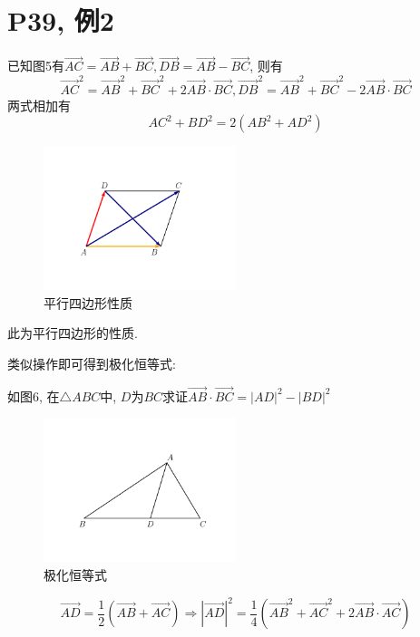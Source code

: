 \documentclass{book}
\begin{document}
    \section{\textcolor[rgb]{0.11,0.65,0.52}{P39, 例2}}
    已知图5有$\overrightarrow{AC}=\overrightarrow{AB}+\overrightarrow{BC},\overrightarrow{DB}=\overrightarrow{AB}-\overrightarrow{BC}$, 则有$$\overrightarrow{AC}^2=\overrightarrow{AB}^2+\overrightarrow{BC}^2+2\overrightarrow{AB}\cdot \overrightarrow{BC},\overrightarrow{DB}^2=\overrightarrow{AB}^2+\overrightarrow{BC}^2-2\overrightarrow{AB}\cdot \overrightarrow{BC}$$
    \textcolor[rgb]{0.75,0.17,0.22}{两式相加}有$$AC^2+BD^2=2(AB^2+AD^2)$$
    \begin{figure}[htbp]
        \centering
        \includegraphics[width=0.5\textwidth]{img/PolarizationIdentity.png}
        \caption{平行四边形性质}
    \end{figure}
    此为平行四边形的性质.

    类似操作即可得到\textcolor[rgb]{0.38,0.11,0.2}{极化恒等式}:

    如图6, 在$\triangle ABC$中, $D$为$BC$求证$\overrightarrow{AB}\cdot \overrightarrow{BC}=|AD|^2-|BD|^2$
    \begin{figure}[htbp]
        \centering
        \includegraphics[width=0.5\textwidth]{img/PolarizationIdentity_p.png}
        \caption{极化恒等式}
    \end{figure}
    \begin{equation}
        \overrightarrow{AD}=\frac{1}{2} \left ( \overrightarrow{AB}+\overrightarrow{AC} \right )\Longrightarrow |\overrightarrow{AD}|^2=\frac{1}{4}\left ( \overrightarrow{AB}^2+\overrightarrow{AC}^2+2\overrightarrow{AB}\cdot \overrightarrow{AC} \right )
    \end{equation}
\end{document}
